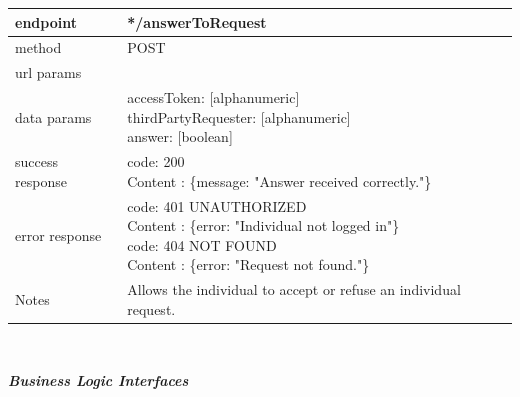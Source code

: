 \begin{legal}
\begin{legal}
\begin{itemize}
								\begin{tabularx}{\linewidth}{| l | l |}
									\hline
									endpoint & */answerToRequest \\
									\hline
									method & POST \\
									\hline
									url params & \\
									\hline
									data params &
									\parbox{0.7\textwidth}{
										\bigskip
										accessToken: [alphanumeric]\\
										thirdPartyRequester: [alphanumeric]\\
										answer: [boolean]
										\bigskip
									} \\
									\hline
									success response &
									\parbox{0.7\textwidth}{
										\bigskip
										code: 200\\
										Content : \{message: "Answer received correctly."\}
										\bigskip
									} \\
									\hline
									error response &
									\parbox{0.7\textwidth}{
										\bigskip
										code: 401 UNAUTHORIZED \\
										Content : \{error: "Individual not logged in"\}\\
										code: 404 NOT FOUND \\
										Content : \{error: "Request not found."\}
										\bigskip
									} \\
									\hline
									Notes & 
									\parbox{0.7\textwidth}{
										\bigskip Allows the individual to accept or refuse an individual request.
									\bigskip}  \\
									\hline
								\end{tabularx}\\
						\end{itemize}
					\item \textit{\textbf{Business Logic Interfaces}}\\
					

\end{legal}
\end{legal}
